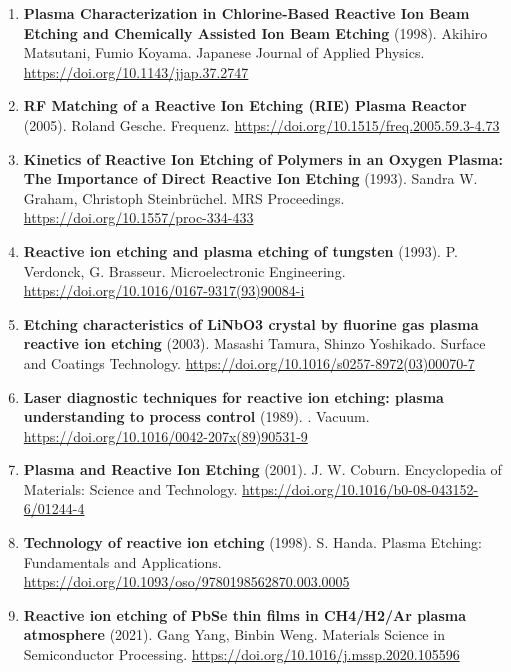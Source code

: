 \documentclass[11pt,a4paper]{article}
\begin{document}
\begin{enumerate}[leftmargin=1.4em]
\item \textbf{Plasma Characterization in Chlorine-Based Reactive Ion Beam Etching and Chemically Assisted Ion Beam Etching} (1998). Akihiro Matsutani, Fumio Koyama. Japanese Journal of Applied Physics. \url{https://doi.org/10.1143/jjap.37.2747}
\item \textbf{RF Matching of a Reactive Ion Etching (RIE) Plasma Reactor} (2005). Roland Gesche. Frequenz. \url{https://doi.org/10.1515/freq.2005.59.3-4.73}
\item \textbf{Kinetics of Reactive Ion Etching of Polymers in an Oxygen Plasma: The Importance of Direct Reactive Ion Etching} (1993). Sandra W. Graham, Christoph Steinbrüchel. MRS Proceedings. \url{https://doi.org/10.1557/proc-334-433}
\item \textbf{Reactive ion etching and plasma etching of tungsten} (1993). P. Verdonck, G. Brasseur. Microelectronic Engineering. \url{https://doi.org/10.1016/0167-9317(93)90084-i}
\item \textbf{Etching characteristics of LiNbO3 crystal by fluorine gas plasma reactive ion etching} (2003). Masashi Tamura, Shinzo Yoshikado. Surface and Coatings Technology. \url{https://doi.org/10.1016/s0257-8972(03)00070-7}
\item \textbf{Laser diagnostic techniques for reactive ion etching: plasma understanding to process control} (1989). . Vacuum. \url{https://doi.org/10.1016/0042-207x(89)90531-9}
\item \textbf{Plasma and Reactive Ion Etching} (2001). J. W. Coburn. Encyclopedia of Materials: Science and Technology. \url{https://doi.org/10.1016/b0-08-043152-6/01244-4}
\item \textbf{Technology of reactive ion etching} (1998). S. Handa. Plasma Etching: Fundamentals and Applications. \url{https://doi.org/10.1093/oso/9780198562870.003.0005}
\item \textbf{Reactive ion etching of PbSe thin films in CH4/H2/Ar plasma atmosphere} (2021). Gang Yang, Binbin Weng. Materials Science in Semiconductor Processing. \url{https://doi.org/10.1016/j.mssp.2020.105596}
\end{enumerate}
\end{document}
